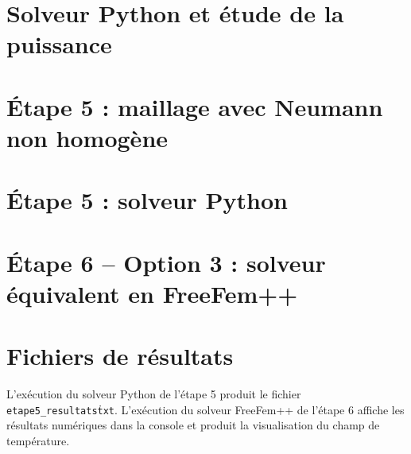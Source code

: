 \documentclass[12pt,a4paper]{article}
\begin{document}
	\section{Solveur Python et étude de la puissance}
	\label{annexe:python}
	
	
	\section{Étape 5 : maillage avec Neumann non homogène}
	\label{annexe:maillage5}
	
	
	\section{Étape 5 : solveur Python}
	\label{annexe:etape5}
	
	
	\section{Étape 6 -- Option 3 : solveur équivalent en FreeFem++}
	\label{annexe:etape6}
	
	
	\section{Fichiers de résultats}
	L'exécution du solveur Python de l'étape 5 produit le fichier
	\texttt{etape5\_resultats\.txt}. L'exécution du solveur
	FreeFem++ de l'étape 6 affiche les résultats numériques dans la console
	et produit la visualisation du champ de température.
	
\end{document}
